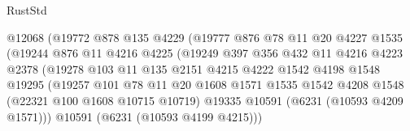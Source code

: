 \begin{lexlean}{RustStd}
\begin{coremodule}
{{                                  @12068
                                  (@19772
                                    @878
                                    @135
                                    @4229
                                    (@19777
                                      @876
                                      @78
                                      @11
                                      @20
                                      @4227
                                      @1535
                                      (@19244
                                        @876
                                        @11
                                        @4216
                                        @4225
                                        (@19249
                                          @397
                                          @356
                                          @432
                                          @11
                                          @4216
                                          @4223
                                          @2378
                                          (@19278
                                            @103
                                            @11
                                            @135
                                            @2151
                                            @4215
                                            @4222
                                            @1542
                                            @4198
                                            @1548
                                            @19295
                                            (@19257
                                              @101
                                              @78
                                              @11
                                              @20
                                              @1608
                                              @1571
                                              @1535
                                              @1542
                                              @4208
                                              @1548
                                              (@22321 @100 @1608 @10715 @10719)
                                              @19335
                                              @10591
                                              (@6231 (@10593 @4209 @1571)))
                                            @10591
                                            (@6231 (@10593 @4199 @4215)))
}}
\end{coremodule}
\end{lexlean}
